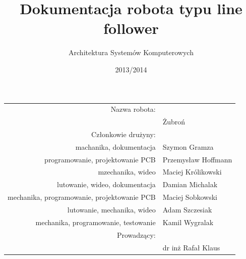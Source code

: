 \documentclass[11pt,a4paper]{article}
\author{Architektura Systemów Komputerowych}
\title{Dokumentacja robota typu line follower}
\date{2013/2014}
\begin{document}
\vspace{3cm}
\maketitle
\vspace{2cm}

\begin{center}
\begin{tabularx}{\linewidth}{rl}
  \hline
  Nazwa robota: & \\
  & Żubroń \\
  \hline 
  Członkowie drużyny: & \\
  machanika, dokumentacja & Szymon Gramza \\
  programowanie, projektowanie PCB & Przemysław Hoffmann \\
  mzechanika, wideo & Maciej Królikowski \\
  lutowanie, wideo, dokumentacja & Damian Michalak \\
  mechanika, programowanie, projektowanie PCB & Maciej Sobkowski \\
  lutowanie, mechanika, wideo & Adam Szczesiak \\
  mechanika, programowanie, testowanie & Kamil Wygralak \\
  \hline
  Prowadzący: & \\
  & dr inż Rafał Klaus \\
  \hline
\end{tabularx} 
\end{center} %

\newpage
\tableofcontents
\newpage
\end{document}
